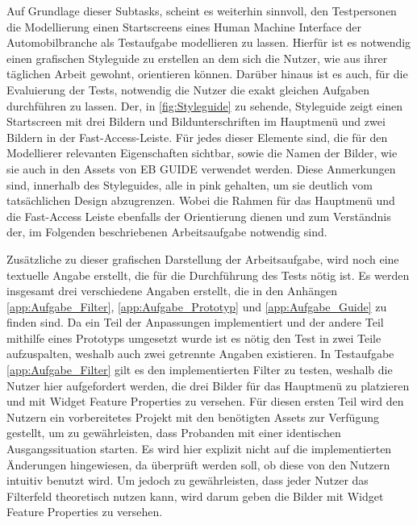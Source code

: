 Auf Grundlage dieser Subtasks, scheint es weiterhin sinnvoll, den Testpersonen die Modellierung einen Startscreens eines Human Machine Interface der Automobilbranche als Testaufgabe modellieren zu lassen.
Hierfür ist es notwendig einen grafischen Styleguide zu erstellen an dem sich die Nutzer, wie aus ihrer täglichen Arbeit gewohnt, orientieren können.
Darüber hinaus ist es auch, für die Evaluierung der Tests, notwendig die Nutzer die exakt gleichen Aufgaben durchführen zu lassen.
Der, in \cref{fig:Styleguide} zu sehende, Styleguide zeigt einen Startscreen mit drei Bildern und Bildunterschriften im Hauptmenü und zwei Bildern in der Fast-Access-Leiste.
Für jedes dieser Elemente sind, die für den Modellierer relevanten Eigenschaften sichtbar, sowie die Namen der Bilder, wie sie auch in den Assets von EB GUIDE verwendet werden.
Diese Anmerkungen sind, innerhalb des Styleguides, alle in pink gehalten, um sie deutlich vom tatsächlichen Design abzugrenzen.
Wobei die Rahmen für das Hauptmenü und die Fast-Access Leiste ebenfalls der Orientierung dienen und zum Verständnis der, im Folgenden beschriebenen Arbeitsaufgabe notwendig sind.

Zusätzliche zu dieser grafischen Darstellung der Arbeitsaufgabe, wird noch eine textuelle Angabe erstellt, die für die Durchführung des Tests nötig ist.
Es werden insgesamt drei verschiedene Angaben erstellt, die in den Anhängen \ref{app:Aufgabe_Filter}, \ref{app:Aufgabe_Prototyp} und \ref{app:Aufgabe_Guide} zu finden sind.
Da ein Teil der Anpassungen implementiert und der andere Teil mithilfe eines Prototyps umgesetzt wurde ist es nötig den Test in zwei Teile aufzuspalten, weshalb auch zwei getrennte Angaben existieren.
In Testaufgabe \ref{app:Aufgabe_Filter} gilt es den implementierten Filter zu testen, weshalb die Nutzer hier aufgefordert werden, die drei Bilder für das Hauptmenü zu platzieren und mit Widget Feature Properties zu versehen.
Für diesen ersten Teil wird den Nutzern ein vorbereitetes Projekt mit den benötigten Assets zur Verfügung gestellt, um zu gewährleisten, dass Probanden mit einer identischen Ausgangssituation starten.
Es wird hier explizit nicht auf die implementierten Änderungen hingewiesen, da überprüft werden soll, ob diese von den Nutzern intuitiv benutzt wird.
Um jedoch zu gewährleisten, dass jeder Nutzer das Filterfeld theoretisch nutzen kann, wird darum geben die Bilder mit Widget Feature Properties zu versehen.

